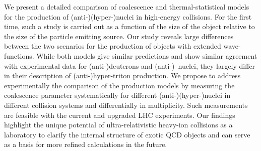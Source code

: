 
We present a detailed comparison of coalescence and thermal-statistical models for the production of (anti-)(hyper-)nuclei in high-energy collisions. For the first time, such a study is carried out as a function of the size of the object relative to the size of the particle emitting source. Our study reveals large differences between the two scenarios for the production of objects with extended wave-functions. While both models give similar predictions and show similar agreement with experimental data for (anti-)deuterons and (anti-)\hethree\ nuclei, they largely differ in their description of (anti-)hyper-triton production.
We propose to address experimentally the comparison of the production models by measuring the coalescence parameter systematically for different (anti-)(hyper-)nuclei in different collision systems and differentially in multiplicity. 
Such measurements are feasible with the current and upgraded LHC experiments. 
Our findings highlight the unique potential of ultra-relativistic heavy-ion collisions as a laboratory to clarify the internal structure of exotic QCD objects and can serve as a basis for more refined calculations in the future.
